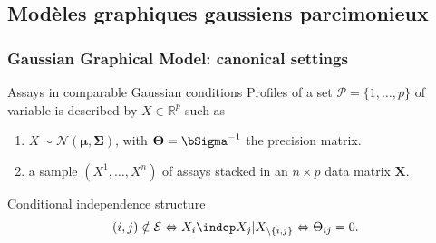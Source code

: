 \documentclass{beamer}\usepackage[]{graphicx}\usepackage[]{color}
\begin{document}
\subsection{Modèles graphiques gaussiens parcimonieux}

\begin{frame}
  \frametitle{Gaussian Graphical Model: canonical settings}

  \begin{block}{Assays in comparable Gaussian conditions}
    Profiles of  a set  $\mathcal{P} =  \{1,\dots,p\}$ of  variable is
    described by $X\in\mathbb{R}^p$ such as
    \begin{enumerate}
    \item  $X\sim\mathcal{N}(\boldsymbol\mu,\boldsymbol\Sigma)$,  with
      $\boldsymbol\Theta = \bSigma^{-1}$ the precision matrix.
    \item  a  sample $(X^1,  \dots,  X^n)$  of  assays stacked  in  an
      $n\times p$ data matrix $\mathbf{X}$.
    \end{enumerate}
  \end{block}

  \begin{overlayarea}{\textwidth}{\textheight}
        
        \begin{block}{Conditional independence structure}
          \vspace{-.5cm}
          \begin{equation*}
            (i,j)  \notin  \mathcal{E}  \Leftrightarrow  X_i  \indep  X_j  |
            X_{\backslash \{i,j\}} \Leftrightarrow \Theta_{ij} = 0.
          \end{equation*}
        \end{block}
        

\end{overlayarea}
\end{frame}
\end{document}
